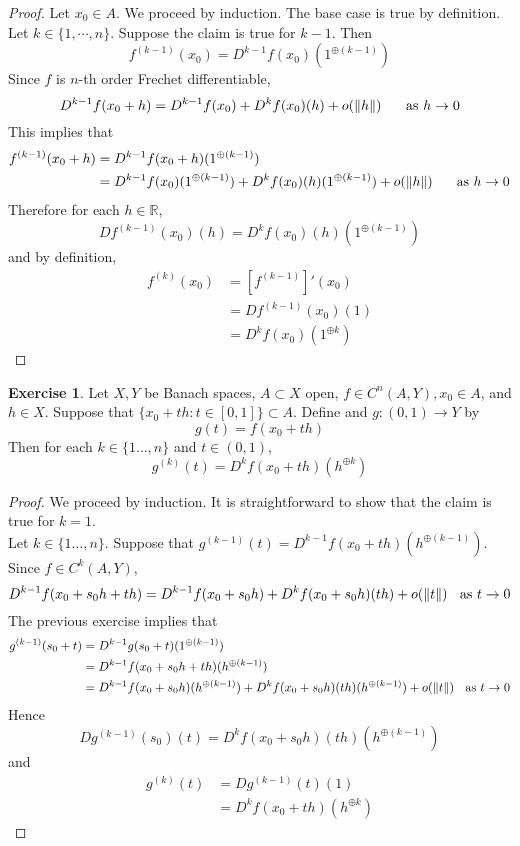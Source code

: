 \documentclass[12pt]{amsart}
\theoremstyle{definition}
\newtheorem{ex}[definition]{Exercise}
\newcommand{\R}{\mathbb{R}}
\DeclareMathOperator*{\0}{\mbf{0}}
\DeclareMathOperator*{\1}{\mbf{1}}
\newcommand{\lex}[1]{\label{ex:#1}}
\begin{document}
	\begin{proof}
	Let $x_0 \in A$. We proceed by induction. The base case is true by definition. Let $k \in \{1, \cdots, n\}$. Suppose the claim is true for $k-1$. Then $$f^{(k-1)}(x_0) = D^{k-1}f(x_0)(1^{\oplus (k-1)})$$
	Since $f$ is $n$-th order Frechet differentiable, $$D^{k-1}f(x_0+h) = D^{k-1}f(x_0) + D^kf(x_0)(h) + o(\|h\|) \hspace{.5cm} \text{ as } h \rightarrow 0$$ 
	This implies that 
	\begin{align*}
	f^{(k-1)}(x_0+h) 
	&=  D^{k-1}f(x_0+h)(1^{\oplus (k-1)}) \\
	&= D^{k-1}f(x_0)(1^{\oplus (k-1)}) + D^kf(x_0)(h)(1^{\oplus (k-1)}) + o(\|h\|) \hspace{.5cm} \text{ as } h \rightarrow 0
	\end{align*}
	Therefore for each $h \in \R$, $$Df^{(k-1)}(x_0)(h) = D^kf(x_0)(h)(1^{\oplus (k-1)})$$
	and by definition,
	\begin{align*}
	f^{(k)}(x_0) 
	&= [f^{(k-1)}]'(x_0) \\
	&= Df^{(k-1)}(x_0)(1) \\
	&=  D^kf(x_0)(1^{\oplus k})
	\end{align*}
	\end{proof}
	
	
	
	
	\begin{ex} \lex{}
	Let $X,Y$ be Banach spaces, $A \subset X$ open, $f \in C^n(A, Y), x_0 \in A$, and $h \in X$. Suppose that $\{x_0 +th: t \in [0,1]\} \subset A$. Define and $g:(0,1) \rightarrow Y$ by $$g(t) = f(x_0 + th)$$
	Then for each $k \in \{1 \dots, n\}$ and $t \in (0,1)$, $$g^{(k)}(t) = D^kf(x_0 + th)(h^{\oplus k})$$
	\end{ex}
	
	\begin{proof}
	We proceed by induction. It is straightforward to show that the claim is true for $k=1$.\\
	Let $k \in \{1 \dots, n\}$. Suppose that $g^{(k-1)}(t) = D^{k-1}f(x_0 + th)(h^{\oplus (k-1)})$. Since $f \in C^k(A, Y)$, $$D^{k-1}f(x_0 + s_0h + th)= D^{k-1}f(x_0 + s_0h) + D^k f(x_0 + s_0h)(th) + o(\|t\|) \hspace{.2cm} \text{ as }t \rightarrow 0 $$ 
	The previous exercise implies that 
	\begin{align*}
	g^{(k-1)}(s_0 + t)
	&= D^{k-1}g(s_0+t)(1^{\oplus (k-1)}) \\
	&= D^{k-1}f(x_0 + s_0h + th)(h^{\oplus (k-1)}) \\
	&= D^{k-1}f(x_0 + s_0h)(h^{\oplus (k-1)}) + D^kf(x_0 + s_0h)(th)(h^{\oplus (k-1)}) + o(\|t\|) \hspace{.2cm} \text{ as }t \rightarrow 0
	\end{align*}
	Hence $$Dg^{(k-1)}(s_0)(t) = D^kf(x_0 + s_0h)(th)(h^{\oplus (k-1)})$$ 
	and 
	\begin{align*}
	g^{(k)}(t)
	&= Dg^{(k-1)}(t)(1) \\
	&= D^kf(x_0 + th)(h^{\oplus k})
	\end{align*}
	\end{proof}
	
\end{document}
